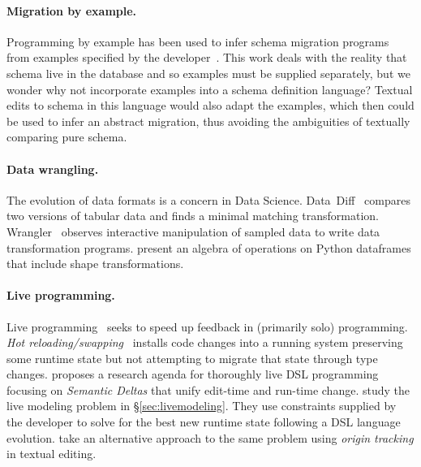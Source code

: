 \documentclass[english,submission]{programming}
\begin{document}
\paragraph{Migration by example.}
Programming by example has been used to infer schema migration programs from examples specified by the developer~\cite{wang20, Alexe11}.
This work deals with the reality that schema live in the database and so examples must be supplied separately, but we wonder why not incorporate examples into a schema definition language? Textual edits to schema in this language would also adapt the examples, which then could be used to infer an abstract migration, thus avoiding the ambiguities of textually comparing pure schema.

\paragraph{Data wrangling.} The evolution of data formats is a concern in Data Science. Data~Diff~\cite{sutton18} compares two versions of tabular data and finds a minimal matching transformation.
Wrangler~\cite{kandel11} observes interactive manipulation of sampled data to write data transformation programs.
\citet{petersohn20} present an algebra of operations on Python dataframes that include shape transformations.

\paragraph{Live programming.}
Live programming~\cite{tanimoto90, rein2018exploratory, HazelnutLive19} seeks to speed up feedback in (primarily solo) programming.
\emph{Hot reloading/swapping}~\cite{barenz2020essence, hicks2005dynamic} installs code changes into a running system preserving some runtime state but not attempting to migrate that state through type changes.
\citet{SemanticDeltas} proposes a research agenda for thoroughly live DSL programming focusing on \emph{Semantic Deltas} that unify edit-time and run-time change.
\citet{RuntimeConstraint} study the live modeling problem in \S\ref{sec:livemodeling}. They use constraints supplied by the developer to solve for the best new runtime state following a DSL language evolution. \citet{vanRozen19} take an alternative approach to the same problem using \emph{origin tracking} in textual editing.


\end{document}
